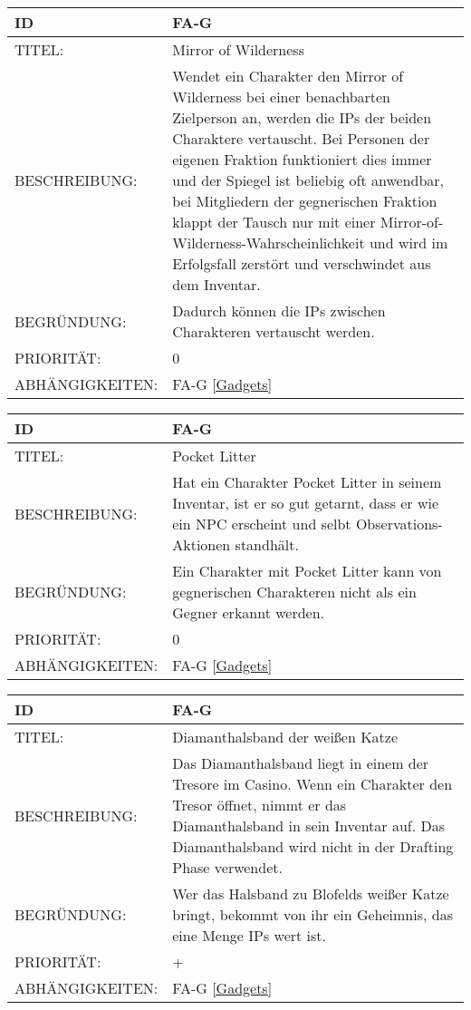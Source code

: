 \begin{tabularx}{16cm}{l|X}
	{table}\label{Mirror of Wilderness}
	\textbf{ID} & \textbf{FA-G \arabic{table}} \\
	\hline
	TITEL: & Mirror of Wilderness \\
	\hline
	BESCHREIBUNG: & Wendet ein Charakter den Mirror of Wilderness bei einer benachbarten Zielperson an, werden die IPs der beiden Charaktere vertauscht. Bei Personen der eigenen Fraktion funktioniert dies immer und der Spiegel ist beliebig oft anwendbar, bei Mitgliedern der gegnerischen Fraktion klappt der Tausch nur mit einer Mirror-of-Wilderness-Wahrscheinlichkeit und wird im Erfolgsfall zerstört und verschwindet aus dem Inventar.\\
	\hline
	BEGRÜNDUNG: &  Dadurch können die IPs zwischen Charakteren vertauscht werden. \\
	\hline
	PRIORITÄT: & 0\\
	\hline
	ABHÄNGIGKEITEN: & FA-G \ref{Gadgets} \\
\end{tabularx}

\begin{tabularx}{16cm}{l|X}
	{table}\label{Pocket Litter}
	\textbf{ID} & \textbf{FA-G \arabic{table}} \\
	\hline
	TITEL: & Pocket Litter \\
	\hline
	BESCHREIBUNG: & Hat ein Charakter Pocket Litter in seinem Inventar, ist er so gut getarnt, dass er wie ein NPC erscheint und selbt Observations-Aktionen standhält. \\
	\hline
	BEGRÜNDUNG: &  Ein Charakter mit Pocket Litter kann von gegnerischen Charakteren nicht als ein Gegner erkannt werden.  \\
	\hline
	PRIORITÄT: & 0\\
	\hline
	ABHÄNGIGKEITEN: & FA-G \ref{Gadgets} \\
\end{tabularx}

\begin{tabularx}{16cm}{l|X}
	{table}\label{Diamanthalsband der weissen Katze}
	\textbf{ID} & \textbf{FA-G \arabic{table}} \\
	\hline
	TITEL: & Diamanthalsband der weißen Katze \\
	\hline
	BESCHREIBUNG: & Das Diamanthalsband liegt in einem der Tresore im Casino. Wenn ein Charakter den Tresor öffnet, nimmt er das Diamanthalsband in sein Inventar auf. Das Diamanthalsband wird nicht in der Drafting Phase verwendet. \\
	\hline
	BEGRÜNDUNG: &  Wer das Halsband zu Blofelds weißer Katze bringt, bekommt von ihr ein Geheimnis, das eine Menge IPs wert ist. \\
	\hline
	PRIORITÄT: & +\\
	\hline
	ABHÄNGIGKEITEN: & FA-G \ref{Gadgets} \\
\end{tabularx}

